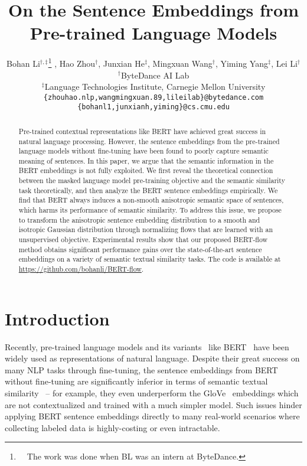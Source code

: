 \documentclass[11pt,a4paper]{article}
\title{On the Sentence Embeddings from Pre-trained Language Models}
\author{Bohan Li$^{\dagger,\ddagger}$\thanks{\ \ The work was done when BL was an intern at ByteDance.} , 
Hao Zhou$^\dagger$, 
Junxian He$^\ddagger$, 
Mingxuan Wang$^\dagger$, 
Yiming Yang$^\ddagger$, 
Lei Li$^\dagger$ \\
  $^\dagger$ByteDance AI Lab \\
  $^\ddagger$Language Technologies Institute, Carnegie Mellon University \\
  {\texttt{\{zhouhao.nlp,wangmingxuan.89,lileilab\}@bytedance.com}} \\
  {\texttt{\{bohanl1,junxianh,yiming\}@cs.cmu.edu}}
  }
\date{}
\begin{document}
\maketitle

\begin{abstract}
Pre-trained contextual representations like BERT have achieved great success in natural language processing. 
However, the sentence embeddings from the pre-trained language models without fine-tuning have been found to poorly capture semantic meaning of sentences. 
In this paper, we argue that the semantic information in the BERT embeddings is not fully exploited. 
We first reveal the theoretical connection between the masked language model pre-training objective and the semantic similarity task theoretically, and then analyze the BERT sentence embeddings empirically. We find that BERT always induces a non-smooth anisotropic semantic space of sentences, which harms its performance of semantic similarity. To address this issue, we propose to transform the anisotropic sentence embedding distribution to a smooth and isotropic Gaussian distribution through normalizing flows that are learned with an unsupervised objective. Experimental results show that our proposed BERT-flow method obtains significant performance gains over the state-of-the-art sentence embeddings on a variety of semantic textual similarity tasks.
The code is available at \url{https://github.com/bohanli/BERT-flow}.

\end{abstract}
 \section{Introduction}
\label{sec:intro}
Recently, pre-trained language models and its variants~\citep{radford2019language,devlin2018bert,yang2019xlnet,liu2019roberta} like BERT~\citep{devlin2018bert} have been widely used as representations of natural language. Despite their great success on many NLP tasks through fine-tuning, the sentence embeddings from BERT without fine-tuning are significantly inferior in terms of semantic textual similarity~\citep{reimers2019sentence} -- for example, they even underperform the GloVe~\citep{pennington2014glove} embeddings which are not contextualized and trained with a much simpler model. Such issues hinder applying BERT sentence embeddings directly to many real-world scenarios where collecting labeled data is highly-costing or even intractable.
\end{document}
